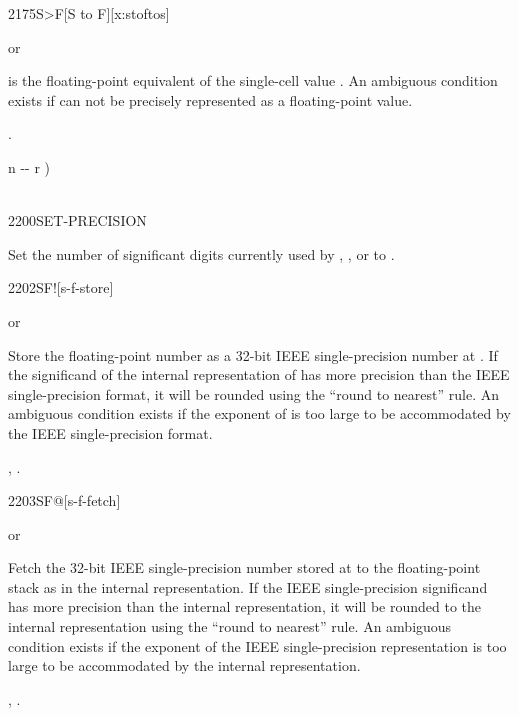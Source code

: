 
\begin{worddef}[StoF]{2175}{S>F}[S to F][x:stoftos]
\item {}  or 

	 is the floating-point equivalent of the single-cell
	value .  An ambiguous condition exists if 
	can not be precisely represented as a floating-point value.

\see {}.

	\begin{implement}
		\word{:}   n -{}- r ) \\
		\tab {}  \\
		\word{;}
	\end{implement}
\end{worddef}



\begin{worddef}{2200}{SET-PRECISION}
\item {}

	Set the number of significant digits currently used by ,
	, or  to .
\end{worddef}


\begin{worddef}{2202}{SF!}[s-f-store]
\item {}  or

	Store the floating-point number  as a 32-bit IEEE
	single-precision number at . If the significand
	of the internal representation of  has more precision
	than the IEEE single-precision format, it will be rounded using
	the ``round to nearest'' rule. An ambiguous condition exists if
	the exponent of  is too large to be accommodated by the
	IEEE single-precision format.

\see {},
	.
\end{worddef}


\begin{worddef}{2203}{SF@}[s-f-fetch]
\item {}  or

	Fetch the 32-bit IEEE single-precision number stored at
	 to the floating-point stack as  in the
	internal representation. If the IEEE single-precision
	significand has more precision than the internal representation,
	it will be rounded to the internal representation using the
	``round to nearest'' rule. An ambiguous condition exists if the
	exponent of the IEEE single-precision representation is too
	large to be accommodated by the internal representation.

\see {},
	.
\end{worddef}


